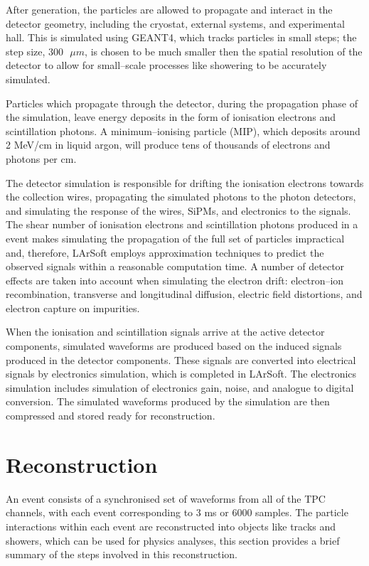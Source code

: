 After generation, the particles are allowed to propagate and interact in the 
detector geometry, including the cryostat, external systems, and experimental
hall. This is simulated using GEANT4\cite{Agostinelli:2002hh}, which tracks 
particles in small steps; the step size, $300 \mbox{ } \mu m$, is chosen to be 
much smaller then the spatial resolution of the detector to allow for 
small--scale processes like showering to be accurately simulated. 

Particles which propagate through the detector, during the propagation phase of
the simulation, leave energy deposits in the form of ionisation electrons and
scintillation photons. A minimum--ionising particle (MIP), which deposits 
around 2 MeV/cm in liquid argon, will produce tens of thousands of electrons 
and photons per cm.

The detector simulation is responsible for drifting the ionisation electrons 
towards the collection wires, propagating the simulated photons to the photon 
detectors, and simulating the response of the wires, SiPMs, and electronics to 
the signals. The shear number of ionisation electrons and scintillation 
photons produced in a \protodune{} event makes simulating the propagation of 
the full set of particles impractical and, therefore, LArSoft employs 
approximation techniques to predict the observed signals within a reasonable 
computation time. A number of detector effects are taken into account when 
simulating the electron drift: electron--ion recombination, transverse and 
longitudinal diffusion, electric field distortions, and electron capture on 
impurities. 

When the ionisation and scintillation signals arrive at the active detector 
components, simulated waveforms are produced based on the induced signals 
produced in the detector components. These signals are converted into 
electrical signals by electronics simulation, which is completed in LArSoft. 
The electronics simulation includes simulation of electronics gain, noise, 
and analogue to digital conversion. The simulated waveforms produced by the 
\protodune{} simulation are then compressed and stored ready for reconstruction.

\section{Reconstruction} \label{sec:reconstruction}

An event consists of a synchronised set of waveforms from all of the TPC 
channels, with each event corresponding to 3 ms or 6000 samples. The particle
interactions within each event are reconstructed into objects like tracks and
showers, which can be used for physics analyses, this section provides a brief 
summary of the steps involved in this reconstruction.

